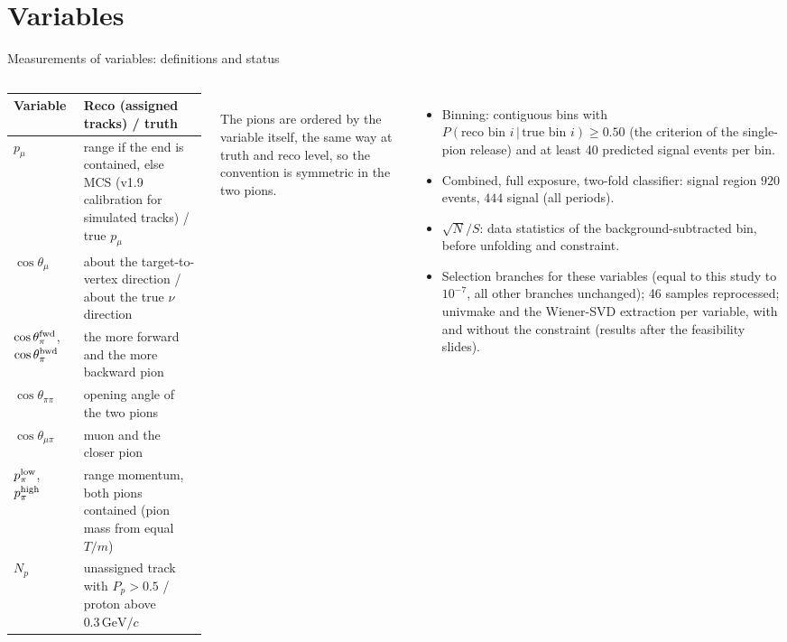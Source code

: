 \documentclass[aspectratio=169,10pt]{beamer}
\newcommand{\GeVc}{\,\text{GeV}/c}
\begin{document}
\section{Variables}

\begin{frame}{Measurements of variables: definitions and status}
  \begin{columns}[T]
  \scriptsize\setlength{\tabcolsep}{3pt}
  \begin{tabular}{lp{}}
    \toprule
    Variable & Reco (assigned tracks) / truth \\
    \midrule
    $p_\mu$ & range if the end is contained, else MCS (v1.9 calibration for simulated tracks) / true $p_\mu$ \\
    $\cos\theta_\mu$ & about the target-to-vertex direction / about the true $\nu$ direction \\
    $\cos\theta_\pi^{\rm fwd}$, $\cos\theta_\pi^{\rm bwd}$ & the more forward and the more backward pion \\
    $\cos\theta_{\pi\pi}$ & opening angle of the two pions \\
    $\cos\theta_{\mu\pi}$ & muon and the closer pion \\
    $p_\pi^{\rm low}$, $p_\pi^{\rm high}$ & range momentum, both pions contained (pion mass from equal $T/m$) \\
    $N_p$ & unassigned track with $P_p>0.5$ / proton above $0.3\GeVc$ \\
    \bottomrule
  \end{tabular}\\[1mm]
  {\tiny The pions are ordered by the variable itself, the same way at truth and reco level, so the convention is
  symmetric in the two pions.}
  \begin{itemize}\footnotesize\setlength\itemsep{3pt}
    \item Binning: contiguous bins with $P(\text{reco bin }i\,|\,\text{true bin }i)\geq0.50$ (the criterion of the
          single-pion release) and at least 40 predicted signal events per bin.
    \item Combined, full exposure, two-fold classifier: signal region $920$ events, $444$ signal (all periods).
    \item $\sqrt{N}/S$: data statistics of the background-subtracted bin, before unfolding and constraint.
    \item Selection branches for these variables (equal to this study to $10^{-7}$, all other branches unchanged);
          46 samples reprocessed; univmake and the Wiener-SVD extraction per variable, with and without the
          constraint (results after the feasibility slides).
  \end{itemize}
  \end{columns}
\end{frame}
\end{document}
